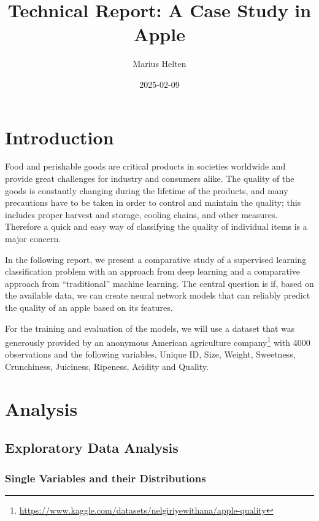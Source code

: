 \documentclass[
]{report}
\title{Technical Report: A Case Study in Apple}
\author{Marius Helten}
\date{2025-02-09}
\DeclareRobustCommand{\href}[2]{#2\footnote{\url{#1}}}
\begin{document}
\maketitle


\section{Introduction}\label{introduction}

Food and perishable goods are critical products in societies worldwide
and provide great challenges for industry and consumers alike. The
quality of the goods is constantly changing during the lifetime of the
products, and many precautions have to be taken in order to control and
maintain the quality; this includes proper harvest and storage, cooling
chains, and other measures. Therefore a quick and easy way of
classifying the quality of individual items is a major concern.

In the following report, we present a comparative study of a supervised
learning classification problem with an approach from deep learning and
a comparative approach from ``traditional'' machine learning. The
central question is if, based on the available data, we can create
neural network models that can reliably predict the quality of an apple
based on its features.

For the training and evaluation of the models, we will use a dataset
that was generously provided by an anonymous American agriculture
\href{https://www.kaggle.com/datasets/nelgiriyewithana/apple-quality}{company}
with 4000 observations and the following variables, Unique ID, Size,
Weight, Sweetness, Crunchiness, Juiciness, Ripeness, Acidity and
Quality.

\section{Analysis}\label{analysis}

\subsection{Exploratory Data Analysis}\label{exploratory-data-analysis}

\subsubsection{Single Variables and their
Distributions}\label{single-variables-and-their-distributions}
\end{document}
